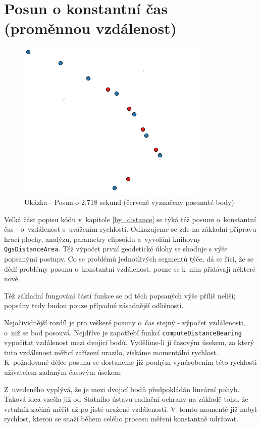 \section{Posun o konstantní čas (proměnnou vzdálenost)}
\label{by_seconds}

  \begin{figure}[H]
   \centering
	\includegraphics[scale=1]{./pictures/time-shift.png}
	\caption[Ukázka - Posun o 2.718 sekund]{Ukázka - Posun o 2.718 sekund (červeně vyznačeny posunuté body)
      \label{fig:time-shift}}
  \end{figure}

Velká část popisu kódu v~kapitole \ref{by_distance} se týká též posunu o~konstantní
čas - o~vzdále\-nost s~uvážením rychlosti. Odkazujeme se zde na základní přípravu hrací plochy,
analýzu, parametry elipsoidu a~vyvolání knihovny {\tt QgsDistanceArea}. Též výpočet první geodetické
úlohy se shoduje s výše popsanými postupy. Co se problémů jednotlivých
segmentů týče, dá se říci, že se dědí problémy posunu o~konstantní vzdálenost, pouze se k~nim
přidávají některé nové. 

Též základní fungování částí funkce se od těch popsaných výše příliš neliší; po\-psány tedy
budou pouze případné zásadnější odlišnosti. 

Nejočividnější rozdíl je pro veškeré posuny o~čas stejný - výpočet vzdálenosti,
o~niž se bod posouvá. Nejdříve je zapotřebí funkcí {\tt computeDistanceBearing}
vypočítat vzdálenost mezi dvojicí bodů. Vydělíme-li ji časovým úsekem, za který tuto vzdálenost
měřicí zařízení urazilo, získáme momentální rychlost. K~požadované délce posunu
se dostaneme již pouhým vynásobením této rychlosti uživatelem zadaným časovým úsekem. 

Z~uvedeného vyplývá, že je mezi dvojicí bodů předpokládán lineární pohyb. Taková idea vzešla
již od Státního ústavu radiační ochrany na základě toho, že vrtulník začíná měřit
až po jisté uražené vzdálenosti. V~tomto momentě již nabyl rychlost, kterou se snaží během
celého procesu měření konstantně udržovat. 

